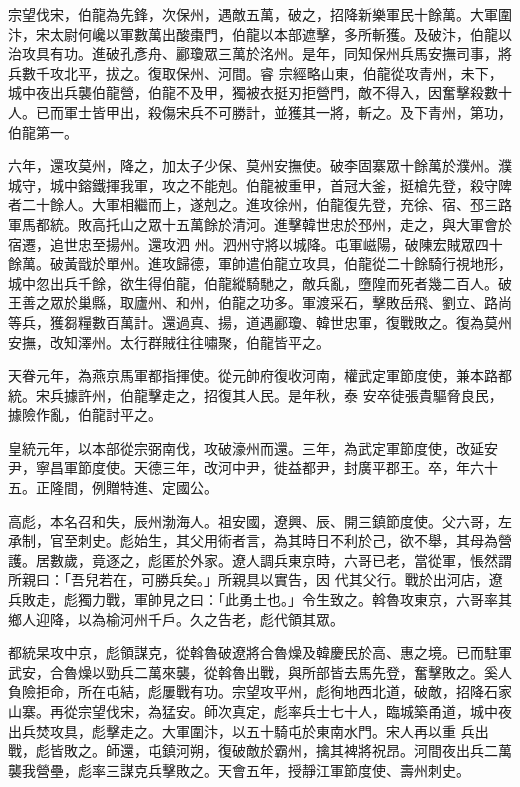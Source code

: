 \begin{pinyinscope}
 宗望伐宋，伯龍為先鋒，次保州，遇敵五萬，破之，招降新樂軍民十餘萬。大軍圍汴，宋太尉何巉以軍數萬出酸棗門，伯龍以本部遮擊，多所斬獲。及破汴，伯龍以治攻具有功。進破孔彥舟、酈瓊眾三萬於洺州。是年，同知保州兵馬安撫司事，將兵數千攻北平，拔之。復取保州、河間。睿
 宗經略山東，伯龍從攻青州，未下，城中夜出兵襲伯龍營，伯龍不及甲，獨被衣挺刃拒營門，敵不得入，因奮擊殺數十人。已而軍士皆甲出，殺傷宋兵不可勝計，並獲其一將，斬之。及下青州，第功，伯龍第一。



 六年，還攻莫州，降之，加太子少保、莫州安撫使。破李固寨眾十餘萬於濮州。濮城守，城中鎔鐵揮我軍，攻之不能剋。伯龍被重甲，首冠大釜，挺槍先登，殺守陴者二十餘人。大軍相繼而上，遂剋之。進攻徐州，伯龍復先登，充徐、宿、邳三路軍馬都統。敗高托山之眾十五萬餘於清河。進擊韓世忠於邳州，走之，與大軍會於宿遷，追世忠至揚州。還攻泗
 州。泗州守將以城降。屯軍嵫陽，破陳宏賊眾四十餘萬。破黃戩於單州。進攻歸德，軍帥遣伯龍立攻具，伯龍從二十餘騎行視地形，城中忽出兵千餘，欲生得伯龍，伯龍縱騎馳之，敵兵亂，墮隍而死者幾二百人。破王善之眾於巢縣，取廬州、和州，伯龍之功多。軍渡采石，擊敗岳飛、劉立、路尚等兵，獲芻糧數百萬計。還過真、揚，道遇酈瓊、韓世忠軍，復戰敗之。復為莫州安撫，改知澤州。太行群賊往往嘯聚，伯龍皆平之。



 天眷元年，為燕京馬軍都指揮使。從元帥府復收河南，權武定軍節度使，兼本路都統。宋兵據許州，伯龍擊走之，招復其人民。是年秋，泰
 安卒徒張貴驅脅良民，據險作亂，伯龍討平之。



 皇統元年，以本部從宗弼南伐，攻破濠州而還。三年，為武定軍節度使，改延安尹，寧昌軍節度使。天德三年，改河中尹，徙益都尹，封廣平郡王。卒，年六十五。正隆間，例贈特進、定國公。



 高彪，本名召和失，辰州渤海人。祖安國，遼興、辰、開三鎮節度使。父六哥，左承制，官至刺史。彪始生，其父用術者言，為其時日不利於己，欲不舉，其母為營護。居數歲，竟逐之，彪匿於外家。遼人調兵東京時，六哥已老，當從軍，悵然謂所親曰：「吾兒若在，可勝兵矣。」所親具以實告，因
 代其父行。戰於出河店，遼兵敗走，彪獨力戰，軍帥見之曰：「此勇土也。」令生致之。斡魯攻東京，六哥率其鄉人迎降，以為榆河州千戶。久之告老，彪代領其眾。



 都統杲攻中京，彪領謀克，從斡魯破遼將合魯燥及韓慶民於高、惠之境。已而駐軍武安，合魯燥以勁兵二萬來襲，從斡魯出戰，與所部皆去馬先登，奮擊敗之。奚人負險拒命，所在屯結，彪屢戰有功。宗望攻平州，彪徇地西北道，破敵，招降石家山寨。再從宗望伐宋，為猛安。師次真定，彪率兵士七十人，臨城築甬道，城中夜出兵焚攻具，彪擊走之。大軍圍汴，以五十騎屯於東南水門。宋人再以重
 兵出戰，彪皆敗之。師還，屯鎮河朔，復破敵於霸州，擒其裨將祝昂。河間夜出兵二萬襲我營壘，彪率三謀克兵擊敗之。天會五年，授靜江軍節度使、壽州刺史。




\end{pinyinscope}
